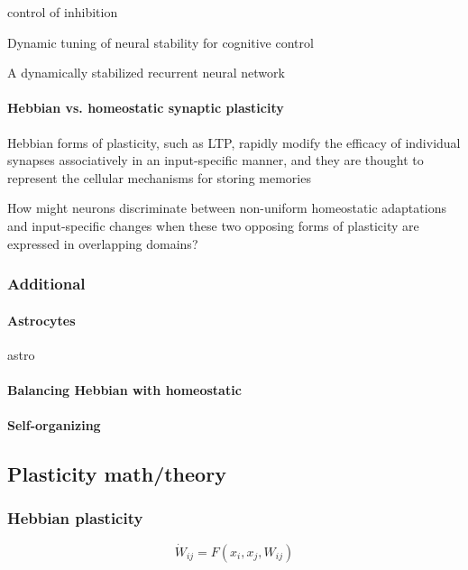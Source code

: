 \documentclass{article}
\theoremstyle{definition} \newtheorem{definition}{Definition}
\theoremstyle{remark} \newtheorem{remark}{Remark}
\newcounter{ct}
\begin{document}
 control of inhibition \citep{machens2005flexible}

 Dynamic tuning of neural stability for cognitive control \citep{xu2024dynamic}
 
 A dynamically stabilized recurrent neural network \citep{saab2022stabilized}
 
\paragraph{Hebbian vs. homeostatic synaptic plasticity}
\citep{pozo2010unraveling}
Hebbian forms of plasticity, such as LTP, rapidly modify the efficacy of individual synapses associatively in an input-specific manner, and they are thought to represent the cellular mechanisms for storing memories

How might neurons discriminate between non-uniform homeostatic adaptations and input-specific changes when these two opposing forms of plasticity are expressed in overlapping domains? \citep{rabinowitch2006interplay, rabinowitch2008two}
 
 
\subsubsection{Additional}
\paragraph{Astrocytes} 
astro\citep{depitta2016astrocytes}
\citep{koshkin2024astrocyte}

\paragraph{Balancing Hebbian with homeostatic}
\citep{zenke2017temporal}

\paragraph{Self-organizing}
\citep{federer2018self}

\subsection{Plasticity math/theory}
\citep{gerstner2002mathematical}
\citep{berner2023adaptive}
\citep{clark2024theory}
\citep{tyulmankov2024computational}


\subsubsection{Hebbian plasticity}
\citep{caporale2008spike}
\begin{equation}
\dot W_{ij} = F(x_i, x_j, W_{ij})
\end{equation}
\end{document}
